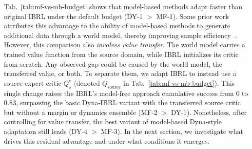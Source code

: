 \documentclass{article} %
\begin{document}
Tab.~\ref{tab:mf-vs-mb-budget} shows that model-based methods adapt faster than original IBRL under the default budget (DY-1 $>$ MF-1). Some prior work attributes this advantage to the ability of model-based methods to generate additional data through a world model, thereby improving sample efficiency~\citep{janner2019trust, lanier2026adapting}. However, this comparison also \emph{involves value transfer}. The world model carries a trained value function from the source domain, while IBRL initializes its critic from scratch. Any observed gap could be caused by the world model, the transferred value, or both. To separate them, we adapt IBRL to instead use a source expert critic $Q^e_s$ (denoted $Q_{\text{source}}$ in Tab.~\ref{tab:mf-vs-mb-budget}). This single change raises the IBRL's model-free approach cumulative success from 0 to 0.83, surpassing the basic Dyna-IBRL variant with the transferred source critic but without a margin or dynamics ensemble (MF-2 $>$ DY-1). Nonetheless, after controlling for value transfer, the best variant of model-based Dyna-style adaptation still leads (DY-4 $>$ MF-3). In the next section, we investigate what drives this residual advantage and under what conditions it emerges.

\end{document}
